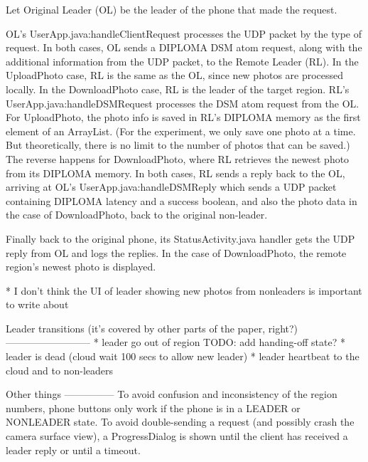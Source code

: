 Let Original Leader (OL) be the leader of the phone that made the request. 

OL’s UserApp.java:handleClientRequest processes the UDP packet by the type of request. In both cases, OL sends a DIPLOMA DSM atom request, along with the additional information from the UDP packet, to the Remote Leader (RL). In the UploadPhoto case, RL is the same as the OL, since new photos are processed locally. In the DownloadPhoto case, RL is the leader of the target region. RL’s UserApp.java:handleDSMRequest processes the DSM atom request from the OL. For UploadPhoto, the photo info is saved in RL’s DIPLOMA memory as the first element of an ArrayList. (For the experiment, we only save one photo at a time. But theoretically, there is no limit to the number of photos that can be saved.) The reverse happens for DownloadPhoto, where RL retrieves the newest photo from its DIPLOMA memory.  In both cases, RL sends a reply back to the OL, arriving at OL’s UserApp.java:handleDSMReply which sends a UDP packet containing DIPLOMA latency and a success boolean, and also the photo data in the case of DownloadPhoto, back to the original non-leader.

Finally back to the original phone, its StatusActivity.java handler gets the UDP reply from OL and logs the replies. In the case of DownloadPhoto, the remote region’s newest photo is displayed.

* I don’t think the UI of leader showing new photos from nonleaders is important to write about

Leader transitions (it’s covered by other parts of the paper, right?)
--------------------------
* leader go out of region TODO: add handing-off state?
* leader is dead (cloud wait 100 secs to allow new leader)
* leader heartbeat to the cloud and to non-leaders

 Other things
---------------
To avoid confusion and inconsistency of the region numbers, phone buttons only work if the phone is in a LEADER or NONLEADER state.  To avoid double-sending a request (and possibly crash the camera surface view), a ProgressDialog is shown until the client has received a leader reply or until a timeout. 
